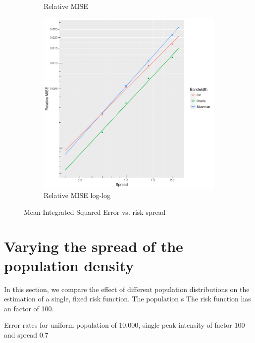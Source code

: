 \begin{figure}[htbp]
\begin{subfigure}[b]{0.3\textwidth}
    \caption{Relative MISE}
    \end{subfigure}
    \begin{subfigure}[b]{0.3\textwidth}
    \includegraphics[width=\textwidth]{results/by_cases_spread/RMISE-vs-risk-spread-log-log}
    \caption{Relative MISE log-log}
    \end{subfigure}
    \caption[MISE: by risk spread]{Mean Integrated Squared Error vs. risk spread}
    \label{fig:ise:unif_100_SD}
\end{figure}

\section{Varying the spread of the population density}
\label{sec:results:pSD_100_1h}

In this section, we compare the effect of different population distributions on the estimation of a single, fixed risk function.
The population s
The risk function has an \gls{factor} of 100.

\begin{table}[htbp]
\centering

\caption{Error rates for uniform population of 10,000, single peak intensity of \gls{factor} 100 and \gls{spread} 0.7}
\label{tab:results:p0.7_100_1.0_1h}
\end{table}



